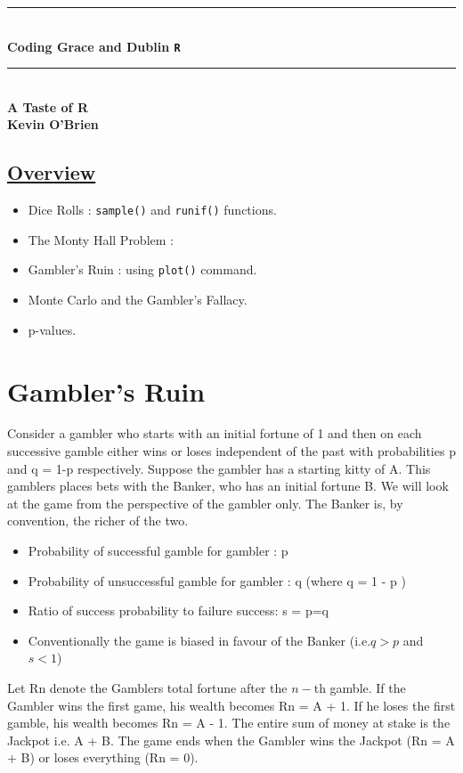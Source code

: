 \documentclass[12pt,a4paper]{article}
\newcommand{\HRule}{\rule{\linewidth}{0.5mm}}
\begin{document}
\begin{titlepage}
\begin{center}
{\HRule} ~\\[0.1cm]
{\textbf\bfseries{\LARGE Coding Grace and Dublin \texttt{R}}}
\HRule
\newline
\\[0.3in]
{\textbf{\Large{A Taste of R}}}
\\[0.3in]
{\textbf{Kevin O'Brien}}
\\[0.3in]
\end{center}
\begin{center}
\section*{\underline{Overview}}
\end{center}
\newpage
\begin{itemize}
\item Dice Rolls : \texttt{sample()} and \texttt{runif()} functions.
\item The Monty Hall Problem : 
\item Gambler's Ruin : using \texttt{plot()} command.
\item Monte Carlo and the Gambler's Fallacy.
\item p-values.
\end{itemize}
\newpage
\section{Gambler's Ruin}
Consider a gambler who starts with an initial fortune of 1 and then on each successive gamble
either wins  or loses independent of the past with probabilities p and q = 1-p respectively.
Suppose the gambler has a starting kitty of A. This gamblers places bets with the Banker,
who has an initial fortune B. We will look at the game from the perspective of the gambler
only. The Banker is, by convention, the richer of the two.


\begin{itemize}
\item Probability of successful gamble for gambler : p
\item Probability of unsuccessful gamble for gambler : q (where q = 1 - p )
\item Ratio of success probability to failure success: s = p=q
\item Conventionally the game is biased in favour of the Banker (i.e.$ q > p$ and $s < 1$)
\end{itemize}
Let Rn denote the Gamblers total fortune after the $n-$th gamble.
If the Gambler wins the first game, his wealth becomes Rn = A + 1. If he loses the first
gamble, his wealth becomes Rn = A - 1. The entire sum of money at stake is the Jackpot i.e.
A + B. The game ends when the Gambler wins the Jackpot (Rn = A + B) or loses everything
(Rn = 0).


\end{titlepage}
\end{document}
